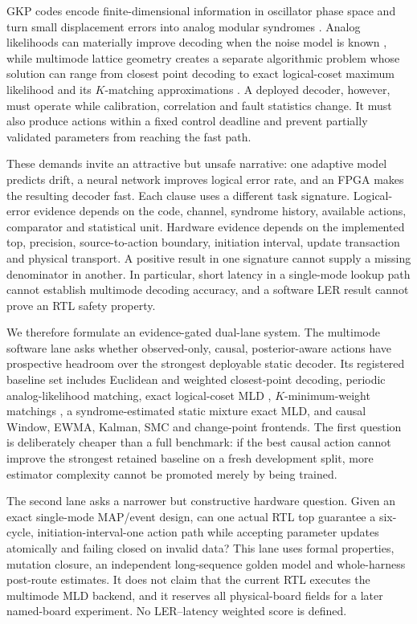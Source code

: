 \documentclass[11pt]{article}
\begin{document}
GKP codes encode finite-dimensional information in oscillator phase space and
turn small displacement errors into analog modular syndromes
\cite{gkp2001}.  Analog likelihoods can materially improve decoding when the
noise model is known \cite{fukui2018,noh2020}, while multimode lattice geometry
creates a separate algorithmic problem whose solution can range from closest
point decoding \cite{lin2023} to exact logical-coset maximum likelihood and its
$K$-matching approximations \cite{linmld2025,linkmwm2025}.  A deployed
decoder, however, must operate while calibration, correlation and fault
statistics change.  It must also produce actions within a fixed control
deadline and prevent partially validated parameters from reaching the fast
path.

These demands invite an attractive but unsafe narrative: one adaptive model
predicts drift, a neural network improves logical error rate, and an FPGA makes
the resulting decoder fast.  Each clause uses a different task signature.
Logical-error evidence depends on the code, channel, syndrome history,
available actions, comparator and statistical unit.  Hardware evidence depends
on the implemented top, precision, source-to-action boundary, initiation
interval, update transaction and physical transport.  A positive result in one
signature cannot supply a missing denominator in another.  In particular,
short latency in a single-mode lookup path cannot establish multimode decoding
accuracy, and a software LER result cannot prove an RTL safety property.

We therefore formulate an evidence-gated dual-lane system.  The multimode
software lane asks whether observed-only, causal, posterior-aware actions have
prospective headroom over the strongest deployable static decoder.  Its
registered baseline set includes Euclidean and weighted closest-point
decoding, periodic analog-likelihood matching, exact logical-coset MLD
\cite{linmld2025}, $K$-minimum-weight matchings \cite{linkmwm2025}, a
syndrome-estimated static mixture exact MLD,
and causal Window, EWMA, Kalman, SMC and change-point frontends.  The first
question is deliberately cheaper than a full benchmark: if the best causal
action cannot improve the strongest retained baseline on a fresh development
split, more estimator complexity cannot be promoted merely by being trained.

The second lane asks a narrower but constructive hardware question.  Given an
exact single-mode MAP/event design, can one actual RTL top guarantee a
six-cycle, initiation-interval-one action path while accepting parameter
updates atomically and failing closed on invalid data?  This lane uses formal
properties, mutation closure, an independent long-sequence golden model and
whole-harness post-route estimates.  It does not claim that the current RTL
executes the multimode MLD backend, and it reserves all physical-board fields
for a later named-board experiment.  No LER--latency weighted score is defined.
\end{document}

